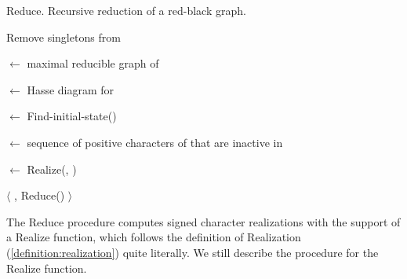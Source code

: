 \begin{algorithm}[h]\label{algorithm:reduce}
  \caption{Reduce. Recursive reduction of a red-black graph.}



  \BlankLine

  Remove singletons from \grb{}\;


  \BlankLine


  \BlankLine


  \BlankLine


  \BlankLine

  \gm{} $\gets$ maximal reducible graph of \grb{}\;

  \hasse{} $\gets$ Hasse diagram for \gm{}\;

  \BlankLine


  \BlankLine

  \Source $\gets$ Find-initial-state(\hasse{})\;

  \Sc $\gets$ sequence of positive characters of \Source that are inactive in \grb{}\;

  \grb{} $\gets$ Realize(\Sc, \grb{})\;

  \BlankLine

  \Return $\langle$ \Sc, Reduce(\grb{}) $\rangle$\;
\end{algorithm}

The Reduce procedure computes signed character realizations with the support of a Realize function, which follows the definition of Realization (\ref{definition:realization}) quite literally.  We still describe the procedure for the Realize function.

